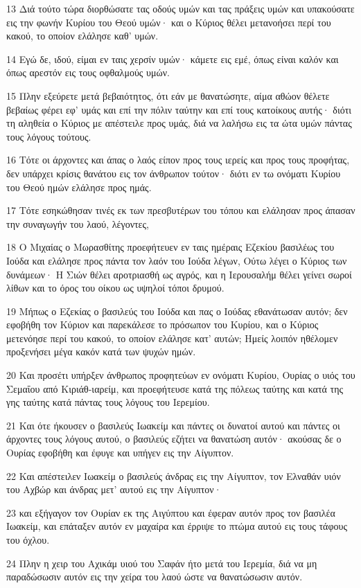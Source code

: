 \par 13 Διά τούτο τώρα διορθώσατε τας οδούς υμών και τας πράξεις υμών και υπακούσατε εις την φωνήν Κυρίου του Θεού υμών· και ο Κύριος θέλει μετανοήσει περί του κακού, το οποίον ελάλησε καθ' υμών.
\par 14 Εγώ δε, ιδού, είμαι εν ταις χερσίν υμών· κάμετε εις εμέ, όπως είναι καλόν και όπως αρεστόν εις τους οφθαλμούς υμών.
\par 15 Πλην εξεύρετε μετά βεβαιότητος, ότι εάν με θανατώσητε, αίμα αθώον θέλετε βεβαίως φέρει εφ' υμάς και επί την πόλιν ταύτην και επί τους κατοίκους αυτής· διότι τη αληθεία ο Κύριος με απέστειλε προς υμάς, διά να λαλήσω εις τα ώτα υμών πάντας τους λόγους τούτους.
\par 16 Τότε οι άρχοντες και άπας ο λαός είπον προς τους ιερείς και προς τους προφήτας, δεν υπάρχει κρίσις θανάτου εις τον άνθρωπον τούτον· διότι εν τω ονόματι Κυρίου του Θεού ημών ελάλησε προς ημάς.
\par 17 Τότε εσηκώθησαν τινές εκ των πρεσβυτέρων του τόπου και ελάλησαν προς άπασαν την συναγωγήν του λαού, λέγοντες,
\par 18 Ο Μιχαίας ο Μωρασθίτης προεφήτευεν εν ταις ημέραις Εζεκίου βασιλέως του Ιούδα και ελάλησε προς πάντα τον λαόν του Ιούδα λέγων, Ούτω λέγει ο Κύριος των δυνάμεων· Η Σιών θέλει αροτριασθή ως αγρός, και η Ιερουσαλήμ θέλει γείνει σωροί λίθων και το όρος του οίκου ως υψηλοί τόποι δρυμού.
\par 19 Μήπως ο Εζεκίας ο βασιλεύς του Ιούδα και πας ο Ιούδας εθανάτωσαν αυτόν; δεν εφοβήθη τον Κύριον και παρεκάλεσε το πρόσωπον του Κυρίου, και ο Κύριος μετενόησε περί του κακού, το οποίον ελάλησε κατ' αυτών; Ημείς λοιπόν ηθέλομεν προξενήσει μέγα κακόν κατά των ψυχών ημών.
\par 20 Και προσέτι υπήρξεν άνθρωπος προφητεύων εν ονόματι Κυρίου, Ουρίας ο υιός του Σεμαΐου από Κιριάθ-ιαρείμ, και προεφήτευσε κατά της πόλεως ταύτης και κατά της γης ταύτης κατά πάντας τους λόγους του Ιερεμίου.
\par 21 Και ότε ήκουσεν ο βασιλεύς Ιωακείμ και πάντες οι δυνατοί αυτού και πάντες οι άρχοντες τους λόγους αυτού, ο βασιλεύς εζήτει να θανατώση αυτόν· ακούσας δε ο Ουρίας εφοβήθη και έφυγε και υπήγεν εις την Αίγυπτον.
\par 22 Και απέστειλεν Ιωακείμ ο βασιλεύς άνδρας εις την Αίγυπτον, τον Ελναθάν υιόν του Αχβώρ και άνδρας μετ' αυτού εις την Αίγυπτον·
\par 23 και εξήγαγον τον Ουρίαν εκ της Αιγύπτου και έφεραν αυτόν προς τον βασιλέα Ιωακείμ, και επάταξεν αυτόν εν μαχαίρα και έρριψε το πτώμα αυτού εις τους τάφους του όχλου.
\par 24 Πλην η χειρ του Αχικάμ υιού του Σαφάν ήτο μετά του Ιερεμία, διά να μη παραδώσωσιν αυτόν εις την χείρα του λαού ώστε να θανατώσωσιν αυτόν.

